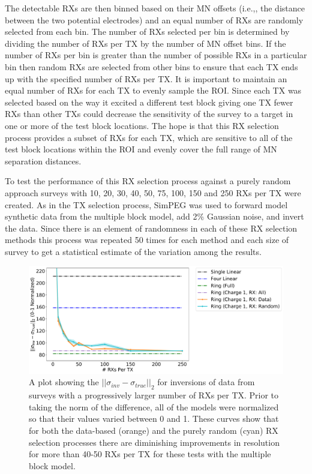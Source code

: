 \documentclass[preprint,authoryear,12pt]{elsarticle}
\begin{document}
The detectable RXs are then binned based on their MN offsets (i.e.,, the distance between the two potential electrodes) and an equal number of RXs are randomly selected from each bin. The number of RXs selected per bin is determined by dividing the number of RXs per TX by the number of MN offset bins. If the number of RXs per bin is greater than the number of possible RXs in a particular bin then random RXs are selected from other bins to ensure that each TX ends up with the specified number of RXs per TX. It is important to maintain an equal number of RXs for each TX to evenly sample the ROI. Since each TX was selected based on the way it excited a different test block giving one TX fewer RXs than other TXs could decrease the sensitivity of the survey to a target in one or more of the test block locations. The hope is that this RX selection process provides a subset of RXs for each TX, which are sensitive to all of the test block locations within the ROI and evenly cover the full range of MN separation distances.

To test the performance of this RX selection process against a purely random approach surveys with 10, 20, 30, 40, 50, 75, 100, 150 and 250 RXs per TX were created. As in the TX selection process, SimPEG was used to forward model synthetic data from the multiple block model, add 2\% Gaussian noise, and invert the data. Since there is an element of randomness in each of these RX selection methods this process was repeated 50 times for each method and each size of survey to get a statistical estimate of the variation among the results.


\begin{figure} [htp]
   \begin{center}
      \includegraphics[trim=0cm 0cm 0cm 0cm, clip=true, width=0.9\linewidth]{./figures/Fig23.pdf}
   \end{center}
   \vspace{-0.5cm}
\caption{A plot showing the $\left|| \sigma_{inv} - \sigma_{true} \right||_2$ for inversions of data from surveys with a progressively larger number of RXs per TX. Prior to taking the norm of the difference, all of the models were normalized so that their values varied between 0 and 1. These curves show that for both the data-based (orange) and the purely random (cyan) RX selection processes there are diminishing improvements in resolution for more than 40-50 RXs per TX for these tests with the multiple block model.}
\label{fig:SurveyDesignComp_StraightTunnel_MultiBlk_RxSelection}
\end{figure}
\end{document}
